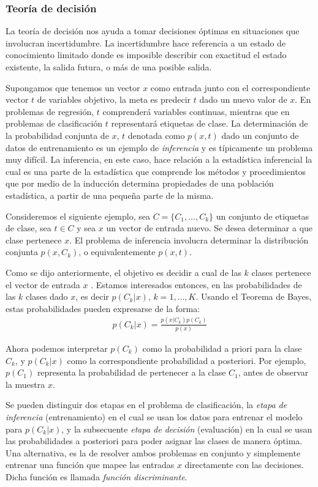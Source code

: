 \subsubsection{Teoría de decisión}
	
	La teoría de decisión nos ayuda a tomar decisiones óptimas en situaciones que involucran incertidumbre. La incertidumbre hace referencia a un estado de conocimiento limitado donde es imposible describir con exactitud el estado existente, la salida futura, o más de una posible salida.
	
	Supongamos que tenemos un vector $x$ como entrada junto con el correspondiente vector $t$ de variables objetivo, la meta es predecir $t$ dado un nuevo valor de $x$. En problemas de regresión, $t$ comprenderá variables continuas, mientras que en problemas de clasificación $t$ representará etiquetas de clase. La determinación de la probabilidad conjunta de $x$, $t$ denotada como $p(x,t)$ dado un conjunto de datos de entrenamiento es un ejemplo de \textit{inferencia} y es típicamente un problema muy difícil. La inferencia, en este caso, hace relación a la estadística inferencial la cual es una parte de la estadística que comprende los métodos y procedimientos que por medio de la inducción determina propiedades de una población estadística, a partir de una pequeña parte de la misma.
	
	Consideremos el siguiente ejemplo, sea $C=\{C_1,\dots,C_k\}$ un conjunto de etiquetas de clase, sea $t \in C$ y sea $x$ un vector de entrada nuevo. Se desea determinar a que clase pertenece $x$. El problema de inferencia involucra determinar la distribución conjunta $p(x,C_k)$, o equivalentemente $p(x,t)$.

	Como se dijo anteriormente, el objetivo es decidir a cual de las $k$ clases pertenece el vector de entrada $x$ . Estamos interesados entonces, en las probabilidades de las $k$ clases dado $x$, es decir $p(C_k|x)$, $k=1,\dots,K$. Usando el Teorema de Bayes, estas probabilidades pueden expresarse de la forma:
		\begin{align*}
			p(C_k|x) = \frac{p(x|C_k)p(C_k)}{p(x)}
		\end{align*}

	Ahora podemos interpretar $p(C_k)$ como la probabilidad a priori para la clase $C_k$, y $p(C_k|x)$ como la correspondiente probabilidad a posteriori. Por ejemplo, $p(C_1)$ representa la probabilidad de pertenecer a la clase $C_1$, antes de observar la muestra $x$.
	
	Se pueden distinguir dos etapas en el problema de clasificación, la \textit{etapa de inferencia} (entrenamiento) en el cual se usan los datos para entrenar el modelo para $p(C_k|x)$, y la subsecuente \textit{etapa de decisión} (evaluación) en la cual se usan las probabilidades a posteriori para poder asignar las clases de manera óptima. Una alternativa, es la de resolver ambos problemas en conjunto y simplemente entrenar una función que mapee las entradas $x$ directamente con las decisiones. Dicha función es llamada \textit{función discriminante}.
	
